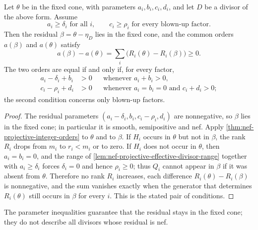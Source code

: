 \begin{theorem}\label{thm:nef-projective-residual-equality}
Let $\theta$ be in the fixed cone, with parameters $a_i,b_i,c_i,d_i$, and let $D$ be a divisor of the above form. Assume
\[
 a_i\geq\delta_i\text{ for all }i,\qquad
 c_i\geq\rho_i\text{ for every blown-up factor}.
\]
Then the residual $\beta=\theta-\eta_D$ lies in the fixed cone, and the common orders $a(\beta)$ and $a(\theta)$ satisfy
\[
 a(\beta)-a(\theta)=\sum_i\bigl(R_i(\theta)-R_i(\beta)\bigr)\geq0.
\]
The two orders are equal if and only if, for every factor,
\begin{align*}
 a_i-\delta_i+b_i&>0&&\text{whenever }a_i+b_i>0,\\
 c_i-\rho_i+d_i&>0&&\text{whenever }a_i=b_i=0\text{ and }c_i+d_i>0;
\end{align*}
the second condition concerns only blown-up factors.
\end{theorem}
\begin{proof}
The residual parameters $(a_i-\delta_i,b_i,c_i-\rho_i,d_i)$ are nonnegative, so $\beta$ lies in the fixed cone; in particular it is smooth, semipositive and nef. Apply \cref{thm:nef-projective-integer-orders} to $\theta$ and to $\beta$. If $H_i$ occurs in $\theta$ but not in $\beta$, the rank $R_i$ drops from $m_i$ to $r_i<m_i$ or to zero. If $H_i$ does not occur in $\theta$, then $a_i=b_i=0$, and the range of \cref{lem:nef-projective-effective-divisor-range} together with $a_i\geq\delta_i$ forces $\delta_i=0$ and hence $\rho_i\geq0$; thus $Q_i$ cannot appear in $\beta$ if it was absent from $\theta$. Therefore no rank $R_i$ increases, each difference $R_i(\theta)-R_i(\beta)$ is nonnegative, and the sum vanishes exactly when the generator that determines $R_i(\theta)$ still occurs in $\beta$ for every $i$. This is the stated pair of conditions.
\end{proof}

The parameter inequalities guarantee that the residual stays in the fixed cone; they do not describe all divisors whose residual is nef.

